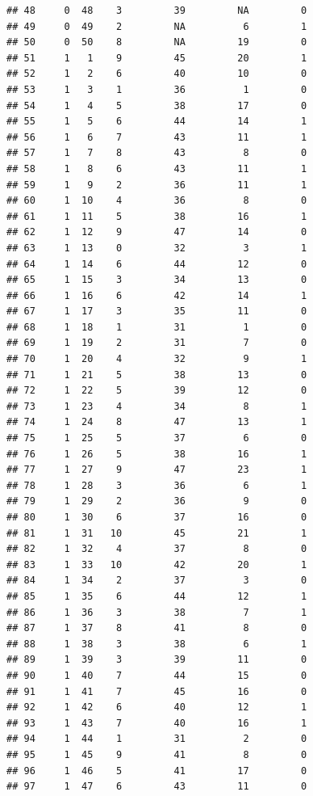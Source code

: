 \documentclass[]{book}
\begin{document}
\begin{verbatim}
## 48     0  48    3         39         NA         0
## 49     0  49    2         NA          6         1
## 50     0  50    8         NA         19         0
## 51     1   1    9         45         20         1
## 52     1   2    6         40         10         0
## 53     1   3    1         36          1         0
## 54     1   4    5         38         17         0
## 55     1   5    6         44         14         1
## 56     1   6    7         43         11         1
## 57     1   7    8         43          8         0
## 58     1   8    6         43         11         1
## 59     1   9    2         36         11         1
## 60     1  10    4         36          8         0
## 61     1  11    5         38         16         1
## 62     1  12    9         47         14         0
## 63     1  13    0         32          3         1
## 64     1  14    6         44         12         0
## 65     1  15    3         34         13         0
## 66     1  16    6         42         14         1
## 67     1  17    3         35         11         0
## 68     1  18    1         31          1         0
## 69     1  19    2         31          7         0
## 70     1  20    4         32          9         1
## 71     1  21    5         38         13         0
## 72     1  22    5         39         12         0
## 73     1  23    4         34          8         1
## 74     1  24    8         47         13         1
## 75     1  25    5         37          6         0
## 76     1  26    5         38         16         1
## 77     1  27    9         47         23         1
## 78     1  28    3         36          6         1
## 79     1  29    2         36          9         0
## 80     1  30    6         37         16         0
## 81     1  31   10         45         21         1
## 82     1  32    4         37          8         0
## 83     1  33   10         42         20         1
## 84     1  34    2         37          3         0
## 85     1  35    6         44         12         1
## 86     1  36    3         38          7         1
## 87     1  37    8         41          8         0
## 88     1  38    3         38          6         1
## 89     1  39    3         39         11         0
## 90     1  40    7         44         15         0
## 91     1  41    7         45         16         0
## 92     1  42    6         40         12         1
## 93     1  43    7         40         16         1
## 94     1  44    1         31          2         0
## 95     1  45    9         41          8         0
## 96     1  46    5         41         17         0
## 97     1  47    6         43         11         0

\end{verbatim}
\end{document}
